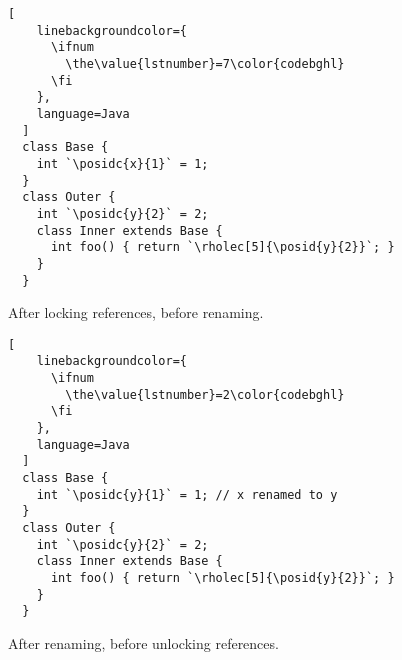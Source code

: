 \centering
\begin{subfigure}[t]{0.48\columnwidth}
  \begin{lstlisting}[
    linebackgroundcolor={
      \ifnum
        \the\value{lstnumber}=7\color{codebghl}
      \fi
    },
    language=Java
  ]
  class Base {
    int `\posidc{x}{1}` = 1;
  }
  class Outer {
    int `\posidc{y}{2}` = 2;
    class Inner extends Base {
      int foo() { return `\rholec[5]{\posid{y}{2}}`; }
    }
  }
  \end{lstlisting}%
  \caption{After locking references, before renaming.}%
  \label{fig:java-rename-example-intermediate-steps-before}
\end{subfigure}%
\hspace{1em}%
\begin{subfigure}[t]{0.48\columnwidth}
  \begin{lstlisting}[
    linebackgroundcolor={
      \ifnum
        \the\value{lstnumber}=2\color{codebghl}
      \fi
    },
    language=Java
  ]
  class Base {
    int `\posidc{y}{1}` = 1; // x renamed to y
  }
  class Outer {
    int `\posidc{y}{2}` = 2;
    class Inner extends Base {
      int foo() { return `\rholec[5]{\posid{y}{2}}`; }
    }
  }
  \end{lstlisting}%
  \caption{After renaming, before unlocking references.}%
  \label{fig:java-rename-example-intermediate-steps-after}
\end{subfigure}%